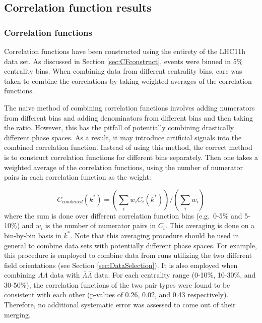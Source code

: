 \subsection{Correlation function results}
\subsubsection{Correlation functions}
\label{sec:CorrelationFunctions}

Correlation functions have been constructed using the entirety of the LHC11h data set.  
As discussed in Section \ref{sec:CFconstruct}, events were binned in 5\% centrality bins.  
When combining data from different centrality bins, care was taken to combine the correlations by taking weighted averages of the correlation functions.  

The naive method of combining correlation functions involves adding numerators from different bins and adding denominators from different bins and then taking the ratio.  
However, this has the pitfall of potentially combining drastically different phase spaces.  
As a result, it may introduce artificial signals into the combined correlation function.  
Instead of using this method, the correct method is to construct correlation functions for different bins separately.  
Then one takes a weighted average of the correlation functions, using the number of numerator pairs in each correlation function as the weight:

\begin{equation}
\label{eq:CombineCF}
C_{combined}(k^*) = (\displaystyle\sum\limits_{i} w_i C_i(k^*))/(\displaystyle\sum\limits_{i} w_i)
\end{equation}
where the sum is done over different correlation function bins (e.g.\ 0-5\% and 5-10\%) and $w_i$ is the number of numerator pairs in $C_i$.  
This averaging is done on a bin-by-bin basis in $k^*$.  
Note that this averaging procedure should be used in general to combine data sets with potentially different phase spaces. 
For example, this procedure is employed to combine data from runs utilizing the two different field orientations (see Section \ref{sec:DataSelection}).  
It is also employed when combining $\Lambda\Lambda$ data with $\bar{\Lambda}\bar{\Lambda}$ data.  For each centrality range (0-10\%, 10-30\%, and 30-50\%), the correlation functions of the two pair types were found to be consistent with each other (p-values of 0.26, 0.02, and 0.43 respectively).  
Therefore, no additional systematic error was assessed to come out of their merging.

